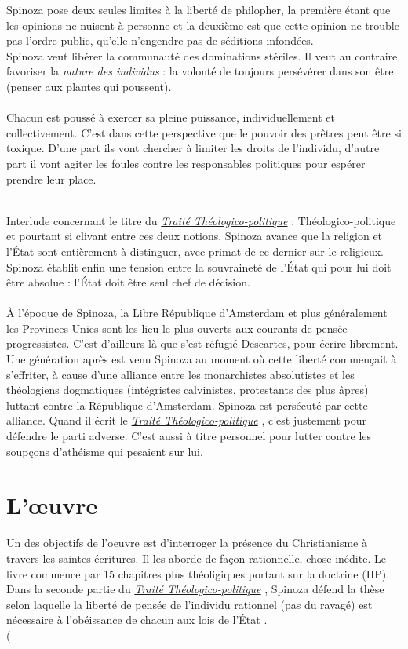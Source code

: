 \documentclass[a4paper,12pt]{article}
\newcommand{\ttp}[0]{\underline{\textit{Traité Théologico-politique}} }
\begin{document}
Spinoza pose deux seules limites à la liberté de philopher, la première étant que les opinions ne nuisent à personne et la deuxième est que cette opinion ne trouble pas l'ordre public, qu'elle n'engendre pas de séditions infondées.
\\Spinoza veut libérer la communauté des dominations stériles. Il veut au contraire favoriser la \textit{nature des individus} : la volonté de toujours persévérer dans son être (penser aux plantes qui poussent).
\\\\Chacun est poussé à exercer sa pleine puissance, individuellement et collectivement. C'est dans cette perspective que le pouvoir des prêtres peut être si toxique. D'une part ils vont chercher à limiter les droits de l'individu, d'autre part il vont agiter les foules contre les responsables politiques pour espérer prendre leur place.\\\\

\newcommand{\etat}[]{État }


Interlude concernant le titre du \ttp : Théologico-politique et pourtant si clivant entre ces deux notions. Spinoza avance que la religion et l'État sont entièrement à distinguer, avec primat de ce dernier sur le religieux. Spinoza établit enfin une tension entre la souvraineté de l'\etat qui pour lui doit être absolue : l'\etat doit être seul chef de décision.\\\\

À l'époque de Spinoza, la Libre République d'Amsterdam et plus généralement les Provinces Unies sont les lieu le plus ouverts aux courants de pensée progressistes. C'est d'ailleurs là que s'est réfugié Descartes, pour écrire librement. Une génération après est venu Spinoza au moment où cette liberté commençait à s'effriter, à cause d'une alliance entre les monarchistes absolutistes et les théologiens dogmatiques (intégristes calvinistes, protestants des plus âpres) luttant contre la République d'Amsterdam. Spinoza est persécuté par cette alliance. Quand il écrit le \ttp, c'est justement pour défendre le parti adverse. C'est aussi à titre personnel pour lutter contre les soupçons d'athéisme qui pesaient sur lui.

\section{L'œuvre}

Un des objectifs de l'oeuvre est d'interroger la présence du Christianisme à travers les saintes écritures. Il les aborde de façon rationnelle, chose inédite. Le livre commence par 15 chapitres plus théoligiques portant sur la doctrine (HP). Dans la seconde partie du \ttp, Spinoza défend la thèse selon laquelle la liberté de pensée de l'individu rationnel (pas du ravagé) est nécessaire à l'obéissance de chacun aux lois de l'\etat.\\(
\end{document}
